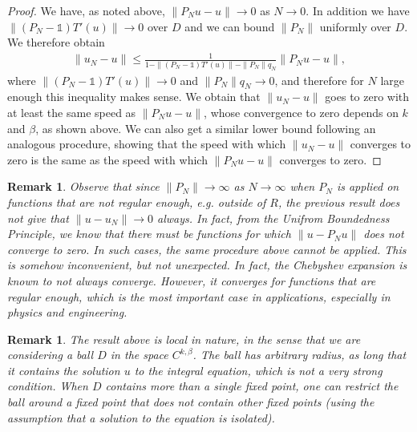\documentclass[11pt,fleqn]{amsart} %
\newtheorem{remark}[theorem]{Remark}
\begin{document}
\begin{proof}
		
		We have, as noted above, $\|P_Nu-u\| \longrightarrow 0$ as $N\longrightarrow 0$. In addition
		we have $\|(P_N - \mathbb 1)T'(u)\| \longrightarrow 0$ over $D$ and we can bound $\|P_N\|$ uniformly over $D$. We therefore obtain
		\begin{eqnarray*}
			\|u_N-u\| \leq \frac{1}{1- \|(P_N-\mathbb 1)T'(u)\| - \|P_N\|q_N}\|P_Nu - u\|,
		\end{eqnarray*}
		where $\|(P_N-\mathbb 1)T'(u)\| \longrightarrow 0$ and $\|P_N\|q_N \longrightarrow 0$, and therefore for $N$ large enough this inequality makes sense. We obtain that $\|u_N-u\|$ goes to zero with at least the same speed as $\|P_Nu - u\|$, whose convergence to zero depends on $k$ and $\beta$, as shown above. We can also get a similar lower bound following an analogous procedure, showing that the speed with which $\|u_N - u\|$ converges to zero is the same as the speed with which $\|P_N u - u\|$ converges to zero. 
	\end{proof}
	
	
	\begin{remark}
		{\rm 
			Observe that since $\|P_N\| \longrightarrow \infty$ as $N \longrightarrow \infty$ when $P_N$ is applied on functions that are not regular enough, e.g. outside of $R$, the previous result does not give that $\|u-u_N\| \longrightarrow 0$ always. In fact, from the Unifrom Boundedness Principle, we know that there must be functions for which $\|u-P_Nu\|$ does not converge to zero. In such cases, the same procedure above cannot be applied. This is somehow inconvenient, but not unexpected. In fact, the Chebyshev expansion is known to not always converge. However, it converges for functions that are regular enough, which is the most important case in applications, especially in physics and engineering.  
		}
	\end{remark}
	
	\begin{remark}
		{\rm 
			The result above is local in nature, in the sense that we are considering a ball $D$ in the space $C^{k,\beta}$. The ball has arbitrary radius, as long that it contains the solution $u$ to the integral equation, which is not a very strong condition. When $D$ contains more than a single fixed point, one can restrict the ball around a fixed point that does not contain other fixed points (using the assumption that a solution to the equation is isolated). 
		}
	\end{remark}
	
	
	
\end{document}
